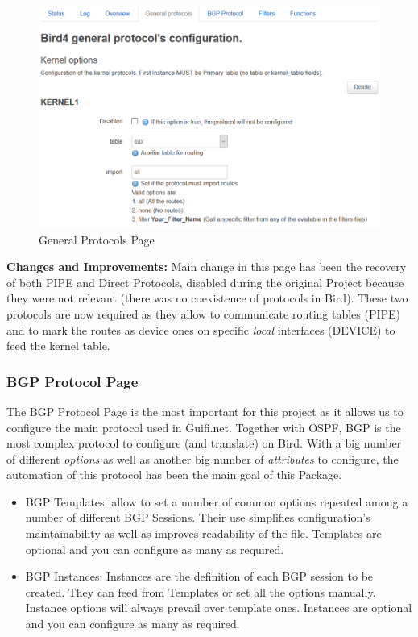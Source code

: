 \begin{figure}[H]
    \centering
    \includegraphics[width=\textwidth]{images/bird0.3/general}
    \caption{General Protocols Page}
    \label{fig:generalp}
\end{figure}

\textbf{Changes and Improvements:}
Main change in this page has been the recovery of both PIPE and Direct Protocols, disabled during the original Project because they were not relevant (there was no coexistence of protocols in Bird). 
These two protocols are now required as they allow to communicate routing tables (PIPE) and to mark the routes as device ones on specific \textit{local} interfaces (DEVICE) to feed the kernel table.

\subsubsection{BGP Protocol Page}
The BGP Protocol Page is the most important for this project as it allows us to configure the main protocol used in Guifi.net. Together with OSPF, BGP is the most complex protocol to configure (and translate) on Bird. With a big number of different \textit{options} as well as another big number of \textit{attributes} to configure, the automation of this protocol has been the main goal of this Package.

\begin{itemize}
    \item BGP Templates: allow to set a number of common options repeated among a number of  different BGP Sessions. Their use simplifies configuration's maintainability as well as improves readability of the file. Templates are optional and you can configure as many as required.
    \item BGP Instances: Instances are the definition of each BGP session to be created. They can feed from Templates or set all the options manually. Instance options will always prevail over template ones. Instances are optional and you can configure as many as required.
\end{itemize}


